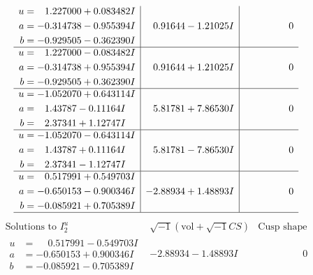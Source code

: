 \documentclass[1p]{elsarticle_modified}
\theoremstyle{definition}
\newcommand{\I}{\sqrt{-1}}
\begin{document}
$$\begin{array}{c|c|c}
\begin{aligned}
u &= \phantom{-}1.227000 + 0.083482 I \\
a &= -0.314738 - 0.955394 I \\
b &= -0.929505 - 0.362390 I\end{aligned}
 & \phantom{-}0.91644 - 1.21025 I & \phantom{-0.000000 } 0 \\ \hline\begin{aligned}
u &= \phantom{-}1.227000 - 0.083482 I \\
a &= -0.314738 + 0.955394 I \\
b &= -0.929505 + 0.362390 I\end{aligned}
 & \phantom{-}0.91644 + 1.21025 I & \phantom{-0.000000 } 0 \\ \hline\begin{aligned}
u &= -1.052070 + 0.643114 I \\
a &= \phantom{-}1.43787 - 0.11164 I \\
b &= \phantom{-}2.37341 + 1.12747 I\end{aligned}
 & \phantom{-}5.81781 + 7.86530 I & \phantom{-0.000000 } 0 \\ \hline\begin{aligned}
u &= -1.052070 - 0.643114 I \\
a &= \phantom{-}1.43787 + 0.11164 I \\
b &= \phantom{-}2.37341 - 1.12747 I\end{aligned}
 & \phantom{-}5.81781 - 7.86530 I & \phantom{-0.000000 } 0 \\ \hline\begin{aligned}
u &= \phantom{-}0.517991 + 0.549703 I \\
a &= -0.650153 - 0.900346 I \\
b &= -0.085921 + 0.705389 I\end{aligned}
 & -2.88934 + 1.48893 I & \phantom{-0.000000 } 0\\
 \hline 
 \end{array}$$\newpage$$\begin{array}{c|c|c}  
\text{Solutions to }I^u_{2}& \I (\text{vol} + \sqrt{-1}CS) & \text{Cusp shape}\\
 \hline 
\begin{aligned}
u &= \phantom{-}0.517991 - 0.549703 I \\
a &= -0.650153 + 0.900346 I \\
b &= -0.085921 - 0.705389 I\end{aligned}
 & -2.88934 - 1.48893 I & \phantom{-0.000000 } 0 \\ \hline\begin{aligned}

\end{aligned}
\end{array}$$
\end{document}
